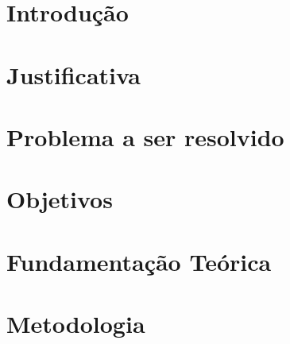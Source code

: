 \documentclass[
    12pt,
    oneside,
    openany,
    a4paper,
    english,
    brazil
]{article}
\begin{document}
\frenchspacing
{}
\setcounter{page}{1}

\singlespacing




\thispagestyle{empty}
\tableofcontents
\clearpage


\renewcommand\thesection{\arabic{section}\hspace{0.2em}-{}}
\renewcommand\thesubsection{\arabic{section}.\arabic{subsection}}

\justify
\onehalfspacing
\setlength\parindent{1.5cm}
\setlength{\parskip}{0.6em}

\begingroup
\let\clearpage\relax
\section[Introdução]{Introdução}

\endgroup

\begingroup
\let\clearpage\relax
\section[Justificativa]{Justificativa}

\endgroup

\begingroup
\let\clearpage\relax
\section[Problema a ser resolvido]{Problema a ser resolvido}

\endgroup

\begingroup
\let\clearpage\relax
\section[Objetivos]{Objetivos}

\endgroup

\begingroup
\let\clearpage\relax
\section[Fundamentação Teórica]{Fundamentação Teórica}

\endgroup

\begingroup
\let\clearpage\relax
\section[Metodologia]{Metodologia}

\endgroup
\end{document}
